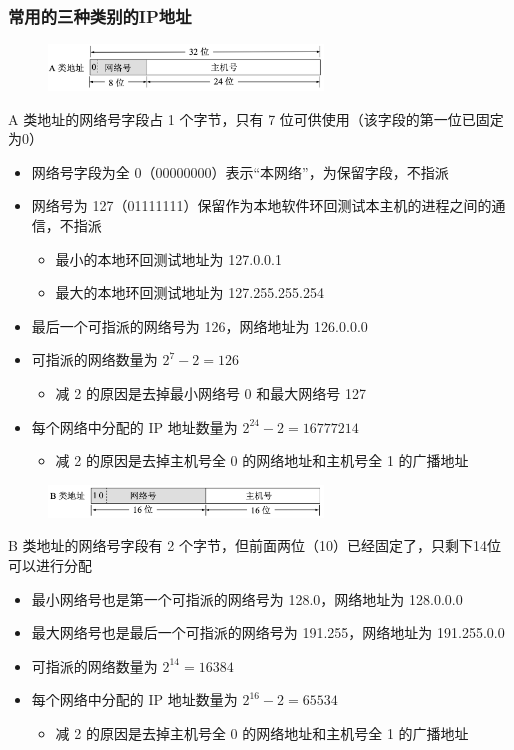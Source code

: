 \documentclass[cs4size,a4paper,10pt]{ctexart}
\begin{document}
	\subsubsection{常用的三种类别的IP地址}
	\begin{figure}[H]
		\centering
		\includegraphics[width=0.65\textwidth]{img/4.2.2.1}
	\end{figure}
	 A 类地址的网络号字段占 1 个字节，只有 7 位可供使用（该字段的第一位已固定为0）
	\begin{itemize}
		\item 网络号字段为全 0（00000000）表示“本网络”，为保留字段，不指派
		\item 网络号为 127（01111111）保留作为本地软件环回测试本主机的进程之间的通信，不指派
		\begin{itemize}
			\item 最小的本地环回测试地址为 127.0.0.1
			\item 最大的本地环回测试地址为 127.255.255.254
		\end{itemize}
		\item 最后一个可指派的网络号为 126，网络地址为 126.0.0.0
		\item 可指派的网络数量为 $2^7 -2=126$
		\begin{itemize}
			\item 减 2 的原因是去掉最小网络号 0 和最大网络号 127
		\end{itemize}
		\item 每个网络中分配的 IP 地址数量为 $2^{24} - 2 = 16777214$
		\begin{itemize}
			\item 减 2 的原因是去掉主机号全 0 的网络地址和主机号全 1 的广播地址
		\end{itemize}
	\end{itemize}
	

	\begin{figure}[H]
		\centering
		\includegraphics[width=0.65\textwidth]{img/4.2.2.2}
	\end{figure}
	B 类地址的网络号字段有 2 个字节，但前面两位（10）已经固定了，只剩下14位可以进行分配
	\begin{itemize}
		\item 最小网络号也是第一个可指派的网络号为 128.0，网络地址为 128.0.0.0
		\item 最大网络号也是最后一个可指派的网络号为 191.255，网络地址为 191.255.0.0
		\item 可指派的网络数量为 $2^{14} = 16384$
		\item 每个网络中分配的 IP 地址数量为 $2^{16} - 2 = 65534$
		\begin{itemize}
			\item 减 2 的原因是去掉主机号全 0 的网络地址和主机号全 1 的广播地址
		\end{itemize}
	\end{itemize}
		
\end{document}
